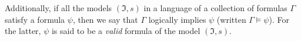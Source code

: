 \begin{definition}
  Additionally, if all the models $(\mathfrak{I},
  s)$ in a language of a collection of formulas 
  $\Gamma$ satisfy a formula $\psi$, then we say 
  that $\Gamma$ logically implies $\psi$ 
  (written $\Gamma \models \psi$). For the 
  latter, $\psi$ is said to be a \emph{valid} 
  formula of the model $(\mathfrak{I}, s)$.

\end{definition}

